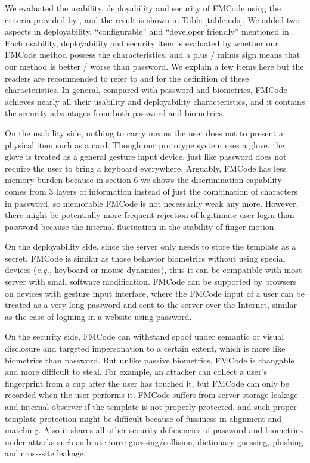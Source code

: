 \documentclass[conference]{IEEEtran}
\begin{document}
We evaluated the usability, deployability and security of FMCode using the criteria provided by \cite{Quest}, and the result is shown in Table \ref{table:uds}. We added two aspects in deployability, ``configurable'' and ``developer friendly'' mentioned in \cite{Engineering}. Each usability, deployability and security item is evaluated by whether our FMCode method possess the characteristics, and a plus / minus sign means that our method is better / worse than password. We explain a few items here but the readers are recommended to refer to \cite{Quest} and \cite{Engineering} for the definition of these characteristics. In general, compared with password and biometrics, FMCode achieves nearly all their usability and deployability characteristics, and it contains the security advantages from both password and biometrics.

On the usability side, nothing to carry means the user does not to present a physical item such as a card. Though our prototype system uses a glove, the glove is treated as a general gesture input device, just like password does not require the user to bring a keyboard everywhere. Arguably, FMCode has less memory burden because in section 6 we shows the discrimination capability comes from 3 layers of information instead of just the combination of characters in password, so memorable FMCode is not necessarily weak any more. However, there might be potentially more frequent rejection of legitimate user login than password because the internal fluctuation in the stability of finger motion. 

On the deployability side, since the server only needs to store the template as a secret, FMCode is similar as those behavior biometrics without using special devices (\textit{e.g.,} keyboard or mouse dynamics), thus it can be compatible with most server with small software modification. FMCode can be supported by browsers on devices with gesture input interface, where the FMCode input of a user can be treated as a very long password and sent to the server over the Internet, similar as the case of logining in a website using password.

On the security side, FMCode can withstand spoof under semantic or visual disclosure and targeted impersonation to a certain extent, which is more like biometrics than password. But unlike passive biometrics, FMCode is changable and more difficult to steal. For example, an attacker can collect a user's fingerprint from a cup after the user has touched it, but FMCode can only be recorded when the user performs it. FMCode suffers from server storage leakage and internal observer if the template is not properly protected, and such proper template protection might be difficult because of fussiness in alignment and matching. Also it shares all other security deficiencies of password and biometrics under attacks such as brute-force guessing/collision, dictionary guessing, phishing and cross-site leakage.
\end{document}
